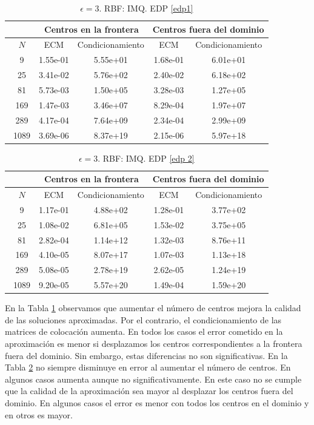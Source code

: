 \documentclass[11pt,a4paper]{article}
\begin{document}
\begin{table}[H]
\centering
\caption{$\epsilon=3$. RBF: IMQ. EDP \ref{edp1}}
\begin{tabular}{|c|cc|cc|}
\hline
\ & \multicolumn{2}{|c|}{Centros en la frontera} & \multicolumn{2}{|c|}{Centros fuera del dominio} \\
\hline
\ $N$& ECM & Condicionamiento & ECM & Condicionamiento \\
\hline
\ 9 & 1.55e-01 & 5.55e+01& 1.68e-01 & 6.01e+01 \\
\ 25 &  3.41e-02& 5.76e+02 & 2.40e-02 &6.18e+02  \\
\ 81 & 5.73e-03 & 1.50e+05&  3.28e-03 & 1.27e+05 \\
\ 169 & 1.47e-03 &3.46e+07  & 8.29e-04&1.97e+07  \\
\ 289 &4.17e-04  & 7.64e+09&  2.34e-04&2.99e+09  \\
\ 1089 & 3.69e-06 & 8.37e+19 &   2.15e-06 &5.97e+18  \\
\hline
\end{tabular}
\label{primera comparacion}
\end{table}

\begin{table}[H]
\centering
\caption{$\epsilon=3$. RBF: IMQ. EDP \ref{edp 2}}
\begin{tabular}{|c|cc|cc|}
\hline
\ & \multicolumn{2}{|c|}{Centros en la frontera} & \multicolumn{2}{|c|}{Centros fuera del dominio} \\
\hline
\ $N$& ECM & Condicionamiento & ECM & Condicionamiento \\
\hline
\ 9 & 1.17e-01 & 4.88e+02& 1.28e-01 & 3.77e+02 \\
\ 25 &  1.08e-02& 6.81e+05 & 1.53e-02 &3.75e+05 \\
\ 81 & 2.82e-04 &1.14e+12&  1.32e-03 & 8.76e+11 \\
\ 169 & 4.10e-05 &8.07e+17  &1.07e-03&1.13e+18  \\
\ 289 &5.08e-05  & 2.78e+19&  2.62e-05&1.24e+19  \\
\ 1089 & 9.20e-05 & 5.57e+20 & 1.49e-04 &1.59e+20\\
\hline
\end{tabular}
\label{primera comparacion 2}
\end{table}
En la Tabla \ref{primera comparacion} observamos que aumentar el número de centros mejora la calidad de las soluciones aproximadas. Por el contrario, el condicionamiento de las matrices de colocación aumenta. En todos los casos el error cometido en la aproximación es menor si desplazamos los centros correspondientes a la frontera fuera del dominio. Sin embargo, estas diferencias no son significativas. 
En la Tabla \ref{primera comparacion 2} no siempre disminuye en error al aumentar el número de centros. En algunos casos aumenta aunque no significativamente. En este caso no se cumple que la calidad de la aproximación sea mayor al desplazar los centros fuera del dominio. En algunos casos el error es menor con todos los centros en el dominio y en otros es mayor. \\
\end{document}
